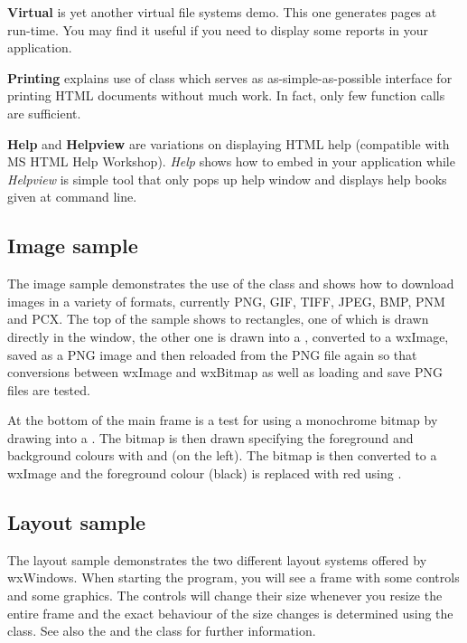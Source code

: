 {\bf Virtual} is yet another virtual file systems demo. This one generates pages at run-time.
You may find it useful if you need to display some reports in your application.

{\bf Printing} explains use of  
class which serves as as-simple-as-possible interface for printing HTML 
documents without much work. In fact, only few function calls are sufficient.

{\bf Help} and {\bf Helpview} are variations on displaying HTML help 
(compatible with MS HTML Help Workshop). {\it Help} shows how to embed 
 in your application
while {\it Helpview} is simple tool that only pops up help window and
displays help books given at command line.

\subsection{Image sample}\label{sampleimage}

The image sample demonstrates the use of the  class
and shows how to download images in a variety of formats, currently PNG, GIF,
TIFF, JPEG, BMP, PNM and PCX. The top of the sample shows to rectangles, one
of which is drawn directly in the window, the other one is drawn into a 
, converted to a wxImage, saved as a PNG image
and then reloaded from the PNG file again so that conversions between wxImage
and wxBitmap as well as loading and save PNG files are tested.

At the bottom of the main frame is a test for using a monochrome bitmap by
drawing into a . The bitmap is then drawn
specifying the foreground and background colours with 
 and 
 (on the left). The
bitmap is then converted to a wxImage and the foreground colour (black) is
replaced with red using .

\subsection{Layout sample}\label{samplelayout}

The layout sample demonstrates the two different layout systems offered
by wxWindows. When starting the program, you will see a frame with some
controls and some graphics. The controls will change their size whenever
you resize the entire frame and the exact behaviour of the size changes
is determined using the  
class. See also the  and the 
class for further information.

